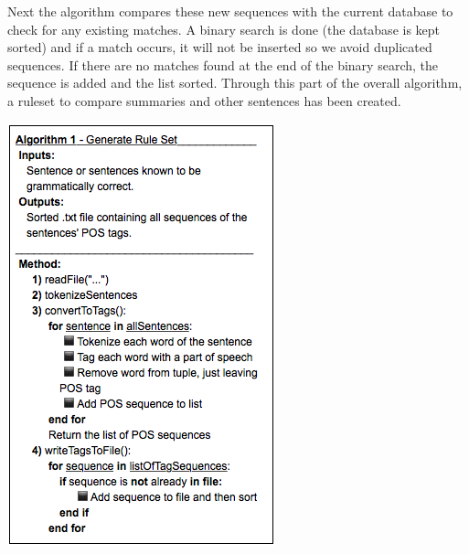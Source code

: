 \documentclass[11pt,a4paper]{article}
\newenvironment{Figure}
  {\par\medskip\noindent\minipage{\linewidth}}
  {\endminipage\par\medskip}
\begin{document}
\begin{multicols}{2}
Next the algorithm compares these new sequences with the current database to check for any existing matches. A binary search is done (the database is kept sorted) and if a match occurs, it will not be inserted so we avoid duplicated sequences. If there are no matches found at the end of the binary search, the sequence is added and the list sorted. Through this part of the overall algorithm, a ruleset to compare summaries and other sentences has been created.

\begin{Figure}  
   \centering
   \includegraphics[width=\linewidth]{GenerateAlgorithm}
\end{Figure}   


\end{multicols}
\end{document}
